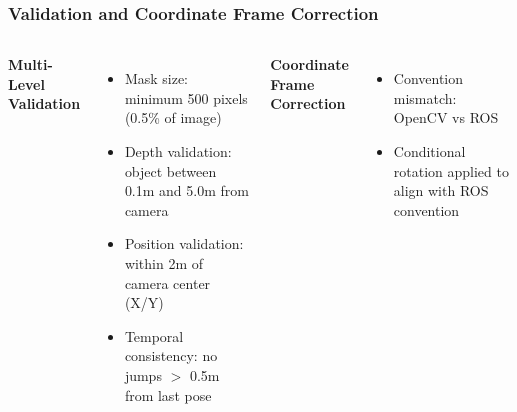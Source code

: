 \documentclass[serif, aspectratio=169, 9pt]{beamer}
\begin{document}
\begin{frame}
\frametitle{Validation and Coordinate Frame Correction}
    \begin{columns}
        \textbf{Multi-Level Validation}
        \begin{itemize}
            \item Mask size: minimum 500 pixels (0.5\% of image)
            \item Depth validation: object between 0.1m and 5.0m from camera
            \item Position validation: within 2m of camera center (X/Y)
            \item Temporal consistency: no jumps $>$ 0.5m from last pose
        \end{itemize}
        \vspace{0.3em}
        \textbf{Coordinate Frame Correction}
        \begin{itemize}
            \item Convention mismatch: OpenCV vs ROS
            \item Conditional rotation applied to align with ROS convention

\end{itemize}
\end{columns}
\end{frame}
\end{document}
